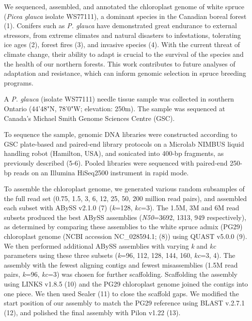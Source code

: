 \documentclass[titlepage,11pt, oneside]{article}   	%
\begin{document}
We sequenced, assembled, and annotated the chloroplast genome of white spruce (\textit{Picea glauca} isolate WS77111), a dominant species in the Canadian boreal forest (1). Conifers such as \textit{P. glauca} have demonstrated great endurance to external stressors, from extreme climates and natural disasters to infestations, tolerating ice ages (2), forest fires (3), and invasive species (4). With the current threat of climate change, their ability to adapt is crucial to the survival of the species and the health of our northern forests. This work contributes to future analyses of adaptation and resistance, which can inform genomic selection in spruce breeding programs.
\newline
\par
A \textit{P. glauca} (isolate WS77111) needle tissue sample was collected in southern Ontario (44'48"N, 78'0"W; elevation: 250m). The sample was sequenced at Canada’s Michael Smith Genome Sciences Centre (GSC).
\newline
\par
To sequence the sample, genomic DNA libraries were constructed according to GSC plate-based and paired-end library protocols on a Microlab NIMBUS liquid handling robot (Hamilton, USA), and sonicated into 400-bp fragments, as previously described (5-6). Pooled libraries were sequenced with paired-end 250-bp reads on an Illumina HiSeq2500 instrument in rapid mode.
\newline
\par
To assemble the chloroplast genome, we generated various random subsamples of the full read set (0.75, 1.5, 3, 6, 12, 25, 50, 200 million read pairs), and assembled each subset with ABySS v2.1.0 (7) (\textit{k}=128, \textit{kc}=3). The 1.5M, 3M and 6M read subsets produced the best ABySS assemblies (\textit{N50}=3692, 1313, 949 respectively), as determined by comparing these assemblies to the white spruce admix (PG29) chloroplast genome (NCBI accession NC\_028594.1; (8)) using QUAST v5.0.0 (9). We then performed additional ABySS assemblies with varying \textit{k} and \textit{kc} parameters using these three subsets (\textit{k}=96, 112, 128, 144, 160, \textit{kc}=3, 4). The assembly with the fewest aligning contigs and fewest misassemblies (1.5M read pairs, \textit{k}=96, \textit{kc}=3) was chosen for further scaffolding. Scaffolding the assembly using LINKS v1.8.5 (10) and the PG29 chloroplast genome joined the contigs into one piece. We then used Sealer (11) to close the scaffold gaps. We modified the start position of our assembly to match the PG29 reference using BLAST v.2.7.1 (12), and polished the final assembly with Pilon v1.22 (13).
\end{document}
